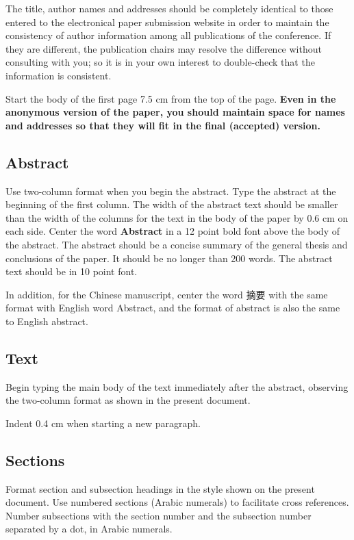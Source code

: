 \documentclass[11pt,a4paper]{article}
\begin{document}
The title, author names and addresses should be completely identical to those entered to the electronical paper submission website in order to maintain the consistency of author information among all publications of the conference.
If they are different, the publication chairs may resolve the difference without consulting with you; so it is in your own interest to double-check that the information is consistent.

Start the body of the first page 7.5 cm from the top of the page.
\textbf{Even in the anonymous version of the paper, you should maintain space for names and addresses so that they will fit in the final (accepted) version.}


\subsection{Abstract}
Use two-column format when you begin the abstract.
Type the abstract at the beginning of the first column.
The width of the abstract text should be smaller than the
width of the columns for the text in the body of the paper by 0.6 cm on each side.
Center the word \textbf{Abstract} in a 12 point bold font above the body of the abstract.
The abstract should be a concise summary of the general thesis and conclusions of the paper.
It should be no longer than 200 words.
The abstract text should be in 10 point font.

In addition, for the Chinese manuscript, center the word 摘要 with the same format with English word Abstract, and the format of abstract is also the same to English abstract.

\subsection{Text}
Begin typing the main body of the text immediately after the abstract, observing the two-column format as shown in the present document.

Indent 0.4 cm when starting a new paragraph.

\subsection{Sections}

Format section and subsection headings in the style shown on the present document.
Use numbered sections (Arabic numerals) to facilitate cross references.
Number subsections with the section number and the subsection number separated by a dot, in Arabic numerals.
\end{document}

